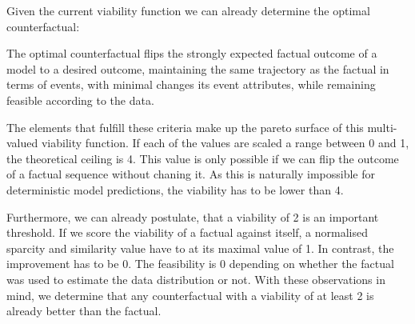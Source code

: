 \documentclass[./../../paper.tex]{subfiles}
\begin{document}
Given the current viability function we can already determine the optimal counterfactual:
\begin{displayquote}
    The optimal counterfactual flips the strongly expected factual outcome of a model to a desired outcome, maintaining the same trajectory as the factual in terms of events, with minimal changes its event attributes, while remaining feasible according to the data.
\end{displayquote}

\noindent The elements that fulfill these criteria make up the pareto surface of this multi-valued viability function. If each of the values are scaled a range between 0 and 1, the theoretical ceiling is 4. This value is only possible if we can flip the outcome of a factual sequence without chaning it. As this is naturally impossible for deterministic model predictions, the viability has to be lower than 4. 

Furthermore, we can already postulate, that a viability of 2 is an important threshold. If we score the viability of a factual against itself, a normalised sparcity and similarity value have to at its maximal value of 1. In contrast, the improvement has to be 0. The feasibility is 0 depending on whether the factual was used to estimate the data distribution or not. With these observations in mind, we determine that any counterfactual with a viability of at least 2 is already better than the factual. 
\end{document}
